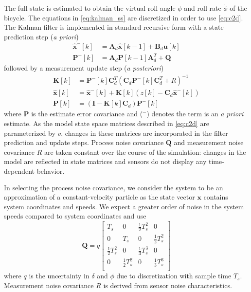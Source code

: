 \documentclass[11pt,a4paper,reqno]{amsart}
\newcommand{\state}{\bm{x}}
\newcommand{\sysInput}{\bm{u}}
\newcommand{\stateMat}{\bm{A}}
\newcommand{\inputMat}{\bm{B}}
\newcommand{\outputMat}{\bm{C}}
\newcommand{\stateEst}{\hat{\bm{x}}}
\newcommand{\meas}{z}
\newcommand{\processCov}{\bm{Q}}
\newcommand{\measCov}{R}
\newcommand{\kalmanGain}{\bm{K}}
\newcommand{\estimateCov}{\bm{P}}
\newcommand{\roll}{\phi}
\newcommand{\steer}{\delta}
\newcommand{\rollRate}{\dot{\phi}}
\begin{document}
The full state is estimated to obtain the virtual roll angle $ \roll $ and roll rate $ \rollRate $ of the bicycle.
The equations in \autoref{eq:kalman_ss} are discretized in order to use \autoref{eq:c2d}.
The Kalman filter is implemented in standard recursive form with a state prediction step (\textit{a priori})
\begin{equation}
\begin{aligned}
    \stateEst^-[k] &= \stateMat_d \stateEst[k - 1] + \inputMat_d \sysInput[k] \\
    \estimateCov^-[k] &= \stateMat_d \estimateCov[k - 1] \stateMat_d^T + \processCov
\end{aligned}
\end{equation}
followed by a measurement update step (\textit{a posteriori})
\begin{equation}
\begin{aligned}
    \kalmanGain[k] &= \estimateCov^-[k] \outputMat_d^T (\outputMat_d \estimateCov^-[k] \outputMat_d^T + \measCov)^{-1} \\
    \stateEst[k] &= \stateEst^-[k] + \kalmanGain[k] (\meas[k] - \outputMat_d \stateEst^-[k] ) \\
    \estimateCov[k] &= (\bm{I} - \kalmanGain[k] \outputMat_d) \estimateCov^-[k]
\end{aligned}
\end{equation}
where $ \estimateCov $ is the estimate error covariance and ($ ^- $) denotes the term is an \textit{a priori} estimate.
As the model state space matrices described in \autoref{eq:c2d} are parameterized by $ v $, changes in these matrices
are incorporated in the filter prediction and update steps.
Process noise covariance $ \processCov $ and measurement noise covariance $ \measCov $ are taken constant over the
course of the simulation: changes in the model are reflected in state matrices and sensors do not display any
time-dependent behavior.

In selecting the process noise covariance, we consider the system to be an approximation of a constant-velocity
particle\cite{reid2001} as the state vector $ \state $ contains system coordinates and speeds.
We expect a greater order of noise in the system speeds compared to system coordinates and use
\begin{equation}
    \processCov = q \begin{bmatrix}
        T_s & 0 & \frac{1}{2}T_s^2 & 0 \\
        0 & T_s & 0 & \frac{1}{2}T_s^2 \\
        \frac{1}{2}T_s^2 & 0 & \frac{1}{3}T_s^3 & 0 \\
        0 & \frac{1}{2}T_s^2 & 0 & \frac{1}{3}T_s^3 \\
    \end{bmatrix}
\end{equation}
where $ q $ is the uncertainty in $ \steer $ and $ \roll $ due to discretization with sample time $ T_s $.
Measurement noise covariance $ \measCov $ is derived from sensor noise characteristics.
\end{document}
